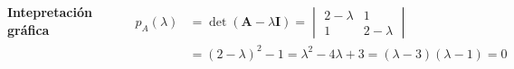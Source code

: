 \documentclass[9pt, aspectratio=169]{beamer}
\begin{document}
\begin{frame}
\begin{columns}[t]
\textbf{Intepretación gráfica}
\begin{center}
    \includegraphics[height=1.0\textheight]{figs/autovalvec-01.pdf}
\end{center}

\begin{align*}
    p_A(\lambda) &= \det(\bm{A} - \lambda \bm{I}) = \begin{vmatrix} 2 - \lambda & 1 \\ 1 & 2 - \lambda \end{vmatrix} \\
                 &= (2 - \lambda)^2 - 1 = \lambda^2 - 4 \lambda + 3 = (\lambda - 3)(\lambda - 1) = 0
\end{align*} \pause


\end{columns}
\end{frame}
\end{document}

